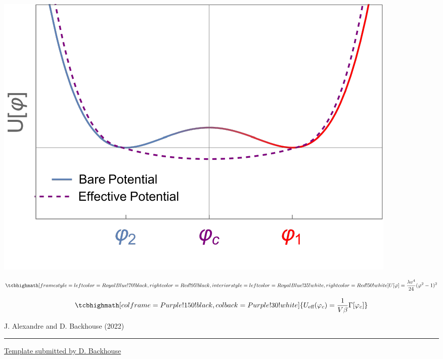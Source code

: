 \documentclass[12pt,preprintnumbers,amsmath,amssymb,nofootinbib,superscriptaddress]{revtex4-1}
\begin{document}
\vspace{0.8cm}

\begin{minipage}{0.6\textwidth}
    \includegraphics[width=\linewidth]{Figures/EffectivePotential.pdf}
\vspace{-2cm}

\end{minipage}
\begin{minipage}{0.39\textwidth}

\begin{equation}
\tcbhighmath[frame style={left color=RoyalBlue!70!black,right color=Red!95!black},interior style={left color=RoyalBlue!35!white,right color=Red!50!white}]{
U[\varphi]=\frac{\lambda v^4}{24}(\varphi^2-1)^2\nonumber}
\end{equation}

\vspace{1cm}

\begin{equation}
\tcbhighmath[colframe=Purple!150!black,colback=Purple!30!white]{
U_\text{eff}(\varphi_c)=\frac{1}{V\beta}\Gamma[\varphi_c]\nonumber}
\end{equation}

\end{minipage}

\vspace{\fill}
\centering
\cite{Alexandre:2022sho} J. Alexandre and D. Backhouse (2022)

\newpage 

\vspace{-0.2cm}\hrule



\vspace{\fill}
\centering
\href{https://www.overleaf.com/latex/templates/academic-presentation-template/jpgfpsstrwzd}{Template submitted by D. Backhouse}
\end{document}
